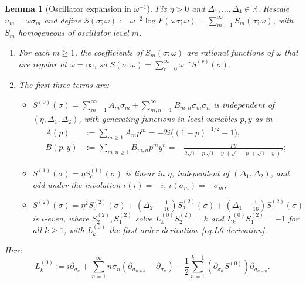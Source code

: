 \documentclass[twoside,10pt]{article}
\numberwithin{equation}{section}
\theoremstyle{slbody}
\newtheorem{lemma}[theorem]{Lemma}
\theoremstyle{definition}
\theoremstyle{remark}
\begin{document}
\begin{lemma}[Oscillator expansion in \(\omega^{-1}\)]
\label{lem:lambda-expansion}
Fix \(\eta>0\) and \(\Delta_1,\dots,\Delta_4\in\mathbb R\).  Rescale
\(u_m=\omega\sigma_m\) and define
\(S(\sigma;\omega):=\omega^{-2}\log F(\omega\sigma;\omega)
=\sum_{m=1}^\infty S_m(\sigma;\omega)\), with \(S_m\) homogeneous of
oscillator level \(m\).
\begin{enumerate}\setlength{\itemsep}{1pt}\setlength{\topsep}{3pt}
\item[(i)] For each \(m\geq1\), the coefficients of \(S_m(\sigma;\omega)\)
  are rational functions of \(\omega\) that are regular at
  \(\omega=\infty\), so
  \(S(\sigma;\omega)=\sum_{r=0}^\infty\omega^{-r}S^{(r)}(\sigma)\).
\item[(ii)] The first three terms are:
  \begin{itemize}\setlength{\itemsep}{1pt}
  \item \(S^{(0)}(\sigma)=\sum_{m=1}^\infty A_m\sigma_m+\sum_{m,n=1}^\infty B_{m,n}\sigma_m\sigma_n\)
    is independent of \((\eta,\Delta_1,\Delta_2)\), with generating functions in
    local variables \(p,y\) as
    in~\cite[(4.20)--(4.21)]{BeskenDattaKraus2019}
    \begin{align}\label{eq:AB-gf}
     A(p)&:=\sum_{m\geq1}A_mp^m=-2i\bigl((1-p)^{-1/2}-1\bigr),\nonumber\\
     B(p,y)&:=\sum_{m,n\geq1}B_{m,n}p^my^n=-\frac{py}{2\sqrt{1-p}\sqrt{1-y}\,(\sqrt{1-p}+\sqrt{1-y})^2};
    \end{align}
  \item \(S^{(1)}(\sigma)=\eta S^{(1)}_c(\sigma)\) is linear in \(\eta\),
    independent of \((\Delta_1,\Delta_2)\), and odd under the involution
    \(\iota(i)=-i\), \(\iota(\sigma_m)=-\sigma_m\);
  \item \(S^{(2)}(\sigma)=\eta^2 S^{(2)}_c(\sigma)
    +(\Delta_2-\tfrac1{16})S^{(2)}_2(\sigma)
    +(\Delta_1-\tfrac1{16})S^{(2)}_1(\sigma)\)
    is \(\iota\)-even, where \(S^{(2)}_2,S^{(2)}_1\) solve
    \(L_k^{(0)}S^{(2)}_2=k\) and \(L_k^{(0)}S^{(2)}_1=-1\) for all
    \(k\geq1\), with \(L_k^{(0)}\) the first-order derivation~\eqref{eq:L0-derivation}.
  \end{itemize}
\end{enumerate}
Here
\begin{equation}\label{eq:L0-derivation}
 L_k^{(0)}:=i\partial_{\sigma_k}
 +\sum_{n=1}^\infty n\sigma_n(\partial_{\sigma_{n+k}}-\partial_{\sigma_n})
 -\frac12\sum_{n=1}^{k-1}(\partial_{\sigma_n}S^{(0)})\partial_{\sigma_{k-n}}.
\end{equation}
\end{lemma}
\end{document}
